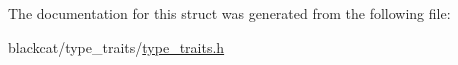 The documentation for this struct was generated from the following file\+:\begin{DoxyCompactItemize}
\item 
blackcat/type\+\_\+traits/\hyperlink{type__traits_2type__traits_8h}{type\+\_\+traits.\+h}\end{DoxyCompactItemize}
